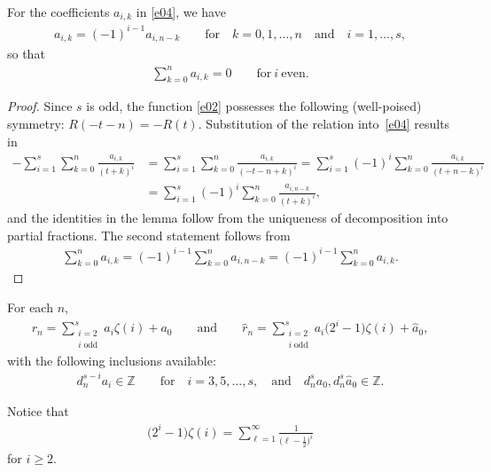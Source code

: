 \documentclass[pdftex]{sigma}
\begin{document}
\begin{lemma}\label{l2} For the coefficients $a_{i,k}$ in \eqref{e04}, we have
\begin{gather*}
a_{i,k}=(-1)^{i-1}a_{i,n-k} \qquad\text{for}\quad k=0,1,\dots,n \quad\text{and}\quad i=1,\dots,s,
\end{gather*}
so that
\begin{gather*}
\sum_{k=0}^na_{i,k}=0 \qquad\text{for} \ i \ \text{even}.
\end{gather*}
\end{lemma}

\begin{proof}
Since $s$ is odd, the function \eqref{e02} possesses the following (well-poised) symmetry: $R(-t-n)=-R(t)$. Substitution of the relation into~\eqref{e04} results in
\begin{align*}
-\sum_{i=1}^s\sum_{k=0}^n\frac{a_{i,k}}{(t+k)^i}
&=\sum_{i=1}^s\sum_{k=0}^n\frac{a_{i,k}}{(-t-n+k)^i}=\sum_{i=1}^s(-1)^i\sum_{k=0}^n\frac{a_{i,k}}{(t+n-k)^i}\\
&=\sum_{i=1}^s(-1)^i\sum_{k=0}^n\frac{a_{i,n-k}}{(t+k)^i},
\end{align*}
and the identities in the lemma follow from the uniqueness of decomposition into partial fractions. The second statement follows from
\begin{gather*}
\sum_{k=0}^na_{i,k}=(-1)^{i-1}\sum_{k=0}^na_{i,n-k}=(-1)^{i-1}\sum_{k=0}^na_{i,k}.\tag*{\qed}
\end{gather*}
\renewcommand{\qed}{}
\end{proof}

\begin{lemma}\label{l3} For each $n$,
\begin{gather*}
r_n=\sum_{\substack{i=2\\i\;\text{odd}}}^sa_i\zeta(i)+a_0
\qquad\text{and}\qquad
\hat r_n=\sum_{\substack{i=2\\i\;\text{odd}}}^sa_i\big(2^i-1\big)\zeta(i)+\hat a_0,
\end{gather*}
with the following inclusions available\textup:
\begin{gather*}
d_n^{s-i}a_i\in\mathbb Z \qquad\text{for}\quad i=3,5,\dots,s,
\quad\text{and}\quad d_n^sa_0, d_n^s\hat a_0\in\mathbb Z.
\end{gather*}
\end{lemma}

Notice that
\begin{gather*}
\big(2^i-1\big)\zeta(i) =\sum_{\ell=1}^\infty\frac1{\big(\ell-\frac12\big)^i}
\end{gather*}
for $i\ge2$.
\end{document}
